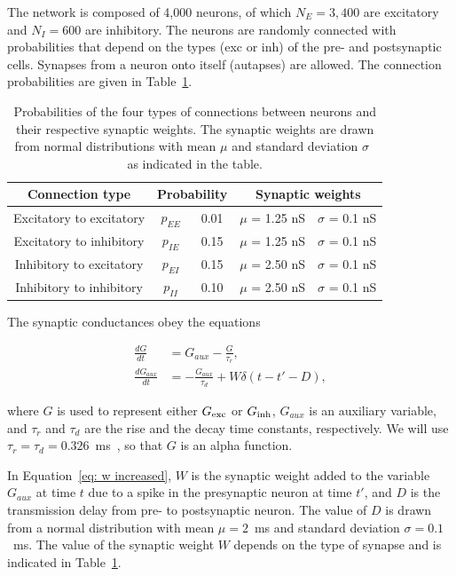 The network is composed of 4,000 neurons, of which $N_E = 3,400$ are excitatory and $N_I = 600$ are inhibitory. The neurons are randomly connected with probabilities that depend on the types (exc or inh) of the pre- and postsynaptic cells. Synapses from a neuron onto itself (autapses) are allowed. The connection probabilities are given in Table~\ref{tab: probability connection}.      

\begin{table}[!h]
\caption{Probabilities of the four types of connections between neurons and their respective synaptic weights. The synaptic weights are drawn from normal distributions with mean $\mu$ and standard deviation $\sigma$~\cite{Vlachos2011} as indicated in the table.}
\centering
\begin{tabular}{ccccc}
\hline
Connection type & \multicolumn{2}{c}{Probability} & \multicolumn{2}{c}{Synaptic weights} \\ \hline
Excitatory to excitatory   & $p_{EE}$         & 0.01         & $\mu$ = 1.25 nS  & $\sigma$ = 0.1 nS \\
Excitatory to inhibitory   & $p_{IE}$         & 0.15         & $\mu$ = 1.25 nS  & $\sigma$ = 0.1 nS \\
Inhibitory to excitatory   & $p_{EI}$         & 0.15         & $\mu$ = 2.50 nS  & $\sigma$ = 0.1 nS \\
Inhibitory to inhibitory   & $p_{II}$         & 0.10         & $\mu$ = 2.50 nS  & $\sigma$ = 0.1 nS \\ \hline
\end{tabular}
\label{tab: probability connection}
\end{table}

The synaptic conductances obey the equations

\begin{align}
    \frac{dG}{dt} &= G_{aux}-\frac{G}{\tau_r},
    \label{eq: G}
    \\
    \frac{dG_{aux}}{dt} &= -\frac{G_{aux}}{\tau_d}+ W\delta(t-t'-D),
    \label{eq: w increased}
\end{align}

where $G$ is used to represent either $G_{\rm exc}$ or  $G_{\rm inh}$, $G_{aux}$ is an auxiliary variable, and $\tau_{r}$ and $\tau_{d}$ are the rise and the decay time constants, respectively. We will use $\tau_r=\tau_d=0.326$~ms~\cite{kumar2008high}, so that $G$ is an alpha function.

In Equation~\ref{eq: w increased}, $W$ is the synaptic weight added to the variable $G_{aux}$ at time $t$ due to a spike in the presynaptic neuron at time $t'$, and $D$ is the transmission delay from pre- to postsynaptic neuron. The value of $D$ is drawn from a normal distribution with mean $\mu = 2$~ms and standard deviation $\sigma = 0.1$~ms. The value of the synaptic weight $W$ depends on the type of synapse and is indicated in Table~\ref{tab: probability connection}.


